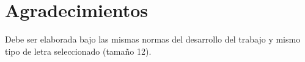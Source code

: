 \chapter*{Agradecimientos}

Debe ser elaborada bajo las mismas normas del desarrollo del trabajo y mismo tipo de letra seleccionado (tama\~no 12).

